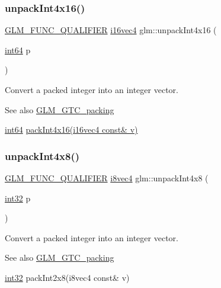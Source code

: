 \subsubsection{\texorpdfstring{unpack\+Int4x16()}{unpackInt4x16()}}
{\footnotesize\ttfamily \hyperlink{setup_8hpp_a33fdea6f91c5f834105f7415e2a64407}{G\+L\+M\+\_\+\+F\+U\+N\+C\+\_\+\+Q\+U\+A\+L\+I\+F\+I\+ER} \hyperlink{group__gtc__type__precision_ga99a249a4cc129cb527c48d3afd38b666}{i16vec4} glm\+::unpack\+Int4x16 (\begin{DoxyParamCaption}\item[{\hyperlink{group__gtc__type__precision_ga435d75819cce297cc5fa21bd84ef89a5}{int64}}]{p }\end{DoxyParamCaption})}

Convert a packed integer into an integer vector.

\begin{DoxySeeAlso}{See also}
\hyperlink{group__gtc__packing}{G\+L\+M\+\_\+\+G\+T\+C\+\_\+packing} 

\hyperlink{group__gtc__type__precision_ga435d75819cce297cc5fa21bd84ef89a5}{int64} \hyperlink{group__gtc__packing_gac3ef78d62735b5c34503c33e37e401c2}{pack\+Int4x16(i16vec4 const\& v)} 
\end{DoxySeeAlso}
\mbox{\label{group__gtc__packing_gaeed27076c5d26f4cca0d06637d3e878c}} 
\subsubsection{\texorpdfstring{unpack\+Int4x8()}{unpackInt4x8()}}
{\footnotesize\ttfamily \hyperlink{setup_8hpp_a33fdea6f91c5f834105f7415e2a64407}{G\+L\+M\+\_\+\+F\+U\+N\+C\+\_\+\+Q\+U\+A\+L\+I\+F\+I\+ER} \hyperlink{group__gtc__type__precision_gaaad99cfb998ddcb74e9c33d0149fdd0e}{i8vec4} glm\+::unpack\+Int4x8 (\begin{DoxyParamCaption}\item[{\hyperlink{group__gtc__type__precision_ga632d8b25f6b61659f39ea4321fab92a4}{int32}}]{p }\end{DoxyParamCaption})}

Convert a packed integer into an integer vector.

\begin{DoxySeeAlso}{See also}
\hyperlink{group__gtc__packing}{G\+L\+M\+\_\+\+G\+T\+C\+\_\+packing} 

\hyperlink{group__gtc__type__precision_ga632d8b25f6b61659f39ea4321fab92a4}{int32} pack\+Int2x8(i8vec4 const\& v) 
\end{DoxySeeAlso}
\mbox{\label{group__gtc__packing_ga5c1ec97894b05ea21a05aea4f0204a02}} 
